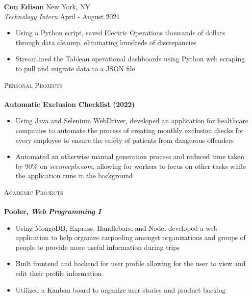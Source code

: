 \documentclass[10pt]{article}
\newcommand{\lineunder} {
    \vspace*{-8pt} \\
    \hspace*{-18pt} \hrulefill \\
}
\newcommand{\header} [1] {
    {\hspace*{-18pt}\vspace*{6pt} \textsc{#1}}
    \vspace*{-6pt} \lineunder
}
\begin{document}
\textbf{Con Edison} \hfill New York, NY\\
\textit{Technology Intern} \hfill April - August 2021\\
\vspace{-1mm}
\begin{itemize}[noitemsep,parsep=0pt,partopsep=0pt]\itemsep 1pt
    \item Using a Python script, saved Electric Operations thousands of dollars through data cleanup, eliminating hundreds of discrepancies
    \item Streamlined the Tableau operational dashboards using Python web scraping to pull and migrate data to a JSON file
\end{itemize}
\vspace{2mm}
\header{Personal Projects}
{\textbf{Automatic Exclusion Checklist (2022)}}
\begin{itemize}[noitemsep,topsep=0.5pt, parsep=0pt,partopsep=0pt]
    \item Using Java and Selenium WebDriver, developed an application for healthcare companies to automate the process of creating monthly exclusion checks for every employee to ensure the safety of patients from dangerous offenders
    \item Automated an otherwise manual generation process and reduced time taken by 90\% on \textit{secureepls.com}, allowing for workers to focus on other tasks while the application runs in the background
\end{itemize}
\vspace{2mm}
\header{Academic Projects}
\textbf{Pooler, \textit{Web Programming I}}
\begin{itemize}[noitemsep, topsep=0.5pt, parsep=0pt,partopsep=0pt]
    \item Using MongoDB, Express, Handlebars, and Node, developed a web application to help organize carpooling amongst organizations and groups of people to provide more useful information during trips
    \item Built frontend and backend for user profile allowing for the user to view and edit their profile information
    \item Utilized a Kanban board to organize user stories and product backlog
\end{itemize}
\end{document}
